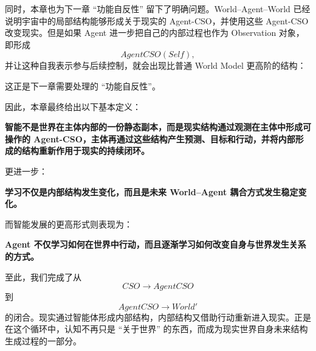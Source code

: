 同时，本章也为下一章 ``功能自反性'' 留下了明确问题。World--Agent--World 已经说明宇宙中的局部结构能够形成关于现实的 Agent-CSO，并使用这些 Agent-CSO 改变现实。但是如果 Agent 进一步把自己的内部过程也作为 Observation 对象，即形成
\[
AgentCSO(Self),
\]
并让这种自我表示参与后续控制，就会出现比普通 World Model 更高阶的结构：
\begin{statementbox}
\centering
{}
\end{statementbox}
这正是下一章需要处理的 ``功能自反性''。

因此，本章最终给出以下基本定义：

\begin{definition*}
\bfseries
智能不是世界在主体内部的一份静态副本，而是现实结构通过观测在主体中形成可操作的 Agent-CSO，主体再通过这些结构产生预测、目标和行动，并将内部形成的结构重新作用于现实的持续闭环。
\end{definition*}

更进一步：

\begin{statementbox}
\bfseries
学习不仅是内部结构发生变化，而且是未来 World--Agent 耦合方式发生稳定变化。
\end{statementbox}

而智能发展的更高形式则表现为：

\begin{statementbox}
\bfseries
Agent 不仅学习如何在世界中行动，而且逐渐学习如何改变自身与世界发生关系的方式。
\end{statementbox}

至此，我们完成了从
\[
CSO
\rightarrow
AgentCSO
\]
到
\[
AgentCSO
\rightarrow
World'
\]
的闭合。现实通过智能体形成内部结构，内部结构又借助行动重新进入现实。正是在这个循环中，认知不再只是 ``关于世界'' 的东西，而成为现实世界自身未来结构生成过程的一部分。
